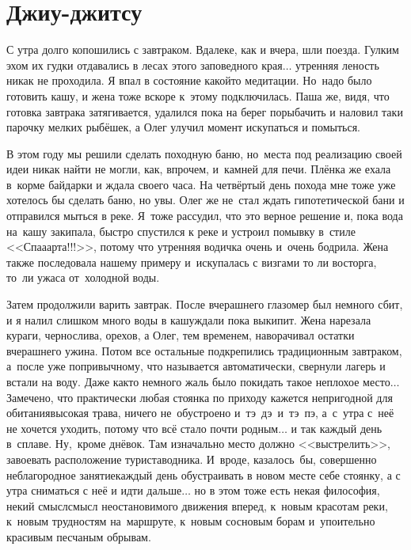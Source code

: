 \chapter{Джиу-джитсу} 
\vepsianrose

С утра долго копошились с завтраком. Вдалеке, как и вчера, шли поезда. Гулким эхом их гудки отдавались в лесах этого заповедного края$\ldots$ утренняя леность никак не проходила. Я впал в состояние какой\sdash то медитации. Но~надо было готовить кашу, и жена тоже вскоре к~этому подключилась. Паша же, видя, что готовка завтрака затягивается, удалился пока на берег порыбачить и наловил таки парочку мелких рыбёшек, а Олег улучил момент искупаться и помыться. 

В этом году мы решили сделать походную баню, но~места под реализацию своей идеи никак найти не могли, как, впрочем, и~камней для печи. Плёнка же ехала в~корме байдарки и ждала своего часа. На четвёртый день похода мне тоже уже хотелось бы сделать баню, но увы. Олег же не~стал ждать гипотетической бани и отправился мыться в реке. Я~тоже рассудил, что это верное решение и, пока вода на~кашу закипала, быстро спустился к реке и устроил помывку в~стиле <<Спа\sdash а\sdash арта!!!>>, потому что утренняя водичка очень и~очень бодрила. Жена также последовала нашему примеру и~искупалась с визгами то ли восторга, то~ли ужаса от~холодной воды. 

Затем продолжили варить завтрак. После вчерашнего глазомер был немного сбит, и я налил слишком много воды в кашу\mdash ждали пока выкипит. Жена нарезала кураги, чернослива, орехов, а Олег, тем временем, наворачивал остатки вчерашнего ужина. Потом все остальные подкрепились традиционным завтраком, а~после уже по\sdash привычному, что называется автоматически, свернули лагерь и встали на воду. Даже как\sdash то немного жаль было покидать такое неплохое место$\ldots$ Замечено, что практически любая стоянка по приходу кажется непригодной для обитания\mdash высокая трава, ничего не~обустроено и~тэ~дэ~и~тэ~пэ, а~с~утра с~неё не хочется уходить, потому что всё стало почти родным$\ldots$ и так каждый день в~сплаве. Ну,~кроме днёвок. Там изначально место должно <<выстрелить>>, завоевать расположение туриста\sdash водника. И~вроде, казалось~бы, совершенно неблагородное занятие\mdash каждый день обустраивать в новом месте себе стоянку, а с утра сниматься с неё и идти дальше$\ldots$ но в этом тоже есть некая философия, некий смысл\mdash смысл неостановимого движения вперед, к~новым красотам реки, к~новым трудностям на~маршруте, к~новым сосновым борам и~упоительно красивым песчаным обрывам.

